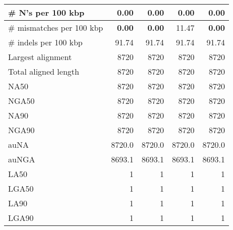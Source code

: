 \documentclass[12pt,a4paper]{article}
\begin{document}
\begin{table}[ht]
\begin{center}
\begin{tabular}{|l*{4}{|r}|}
\# N's per 100 kbp & 0.00 & 0.00 & 0.00 & 0.00 \\ \hline
\# mismatches per 100 kbp & {\bf 0.00} & {\bf 0.00} & 11.47 & {\bf 0.00} \\ \hline
\# indels per 100 kbp & 91.74 & 91.74 & 91.74 & 91.74 \\ \hline
Largest alignment & 8720 & 8720 & 8720 & 8720 \\ \hline
Total aligned length & 8720 & 8720 & 8720 & 8720 \\ \hline
NA50 & 8720 & 8720 & 8720 & 8720 \\ \hline
NGA50 & 8720 & 8720 & 8720 & 8720 \\ \hline
NA90 & 8720 & 8720 & 8720 & 8720 \\ \hline
NGA90 & 8720 & 8720 & 8720 & 8720 \\ \hline
auNA & 8720.0 & 8720.0 & 8720.0 & 8720.0 \\ \hline
auNGA & 8693.1 & 8693.1 & 8693.1 & 8693.1 \\ \hline
LA50 & 1 & 1 & 1 & 1 \\ \hline
LGA50 & 1 & 1 & 1 & 1 \\ \hline
LA90 & 1 & 1 & 1 & 1 \\ \hline
LGA90 & 1 & 1 & 1 & 1 \\ \hline
\end{tabular}
\end{center}
\end{table}
\end{document}
